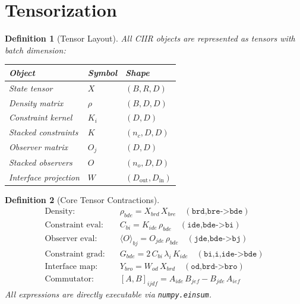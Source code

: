 \documentclass[11pt,a4paper]{article}
\newtheorem{definition}{Definition}[section]
\begin{document}
\section{Tensorization}
\label{sec:tensorization}

\begin{definition}[Tensor Layout]
\label{def:tensor-layout}
All CIIR objects are represented as tensors with batch dimension:
\begin{center}
\begin{tabular}{lll}
Object & Symbol & Shape \\
\hline
State tensor & $X$ & $(B, R, D)$ \\
Density matrix & $\rho$ & $(B, D, D)$ \\
Constraint kernel & $K_i$ & $(D, D)$ \\
Stacked constraints & $K$ & $(n_c, D, D)$ \\
Observer matrix & $O_j$ & $(D, D)$ \\
Stacked observers & $O$ & $(n_o, D, D)$ \\
Interface projection & $W$ & $(D_{\mathrm{out}}, D_{\mathrm{in}})$ \\
\end{tabular}
\end{center}
\end{definition}

\begin{definition}[Core Tensor Contractions]
\label{def:contractions}
\begin{align}
  \text{Density:}\quad & \rho_{bde} = X_{brd}\, X_{bre}
    \quad (\texttt{brd,bre->bde}) \\
  \text{Constraint eval:}\quad & C_{bi} = K_{ide}\, \rho_{bde}
    \quad (\texttt{ide,bde->bi}) \\
  \text{Observer eval:}\quad & \langle O \rangle_{bj} = O_{jde}\, \rho_{bde}
    \quad (\texttt{jde,bde->bj}) \\
  \text{Constraint grad:}\quad & G_{bde} = 2\, C_{bi}\, \lambda_i\, K_{ide}
    \quad (\texttt{bi,i,ide->bde}) \\
  \text{Interface map:}\quad & Y_{bro} = W_{od}\, X_{brd}
    \quad (\texttt{od,brd->bro}) \\
  \text{Commutator:}\quad & [A,B]_{ijdf} = A_{ide}\, B_{jef} - B_{jde}\, A_{ief}
\end{align}
All expressions are directly executable via \texttt{numpy.einsum}.
\end{definition}
\end{document}
